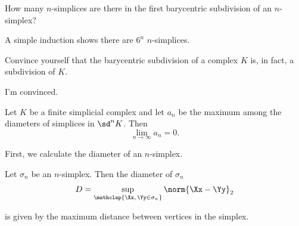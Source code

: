 \begin{problem}[15.24]
  How many $n$-simplices are there in the first barycentric subdivision of an
  $n$-simplex?
\end{problem}
\begin{solution}
  A simple induction shows there are $6^n$ $n$-simplices.
\end{solution}
\begin{problem}[15.25]
  Convince yourself that the barycentric subdivision of a complex $K$ is, in
  fact, a subdivision of $K$.
\end{problem}
\begin{solution}
  I'm convinced.
\end{solution}
\begin{problem}[15.26]
  Let $K$ be a finite simplicial complex and let $a_n$ be the maximum among the
  diameters of simplices in $\sd^n K$. Then
  \[
    \lim_{n\to\infty} a_n = 0.
  \]
\end{problem}
\begin{solution}
  First, we calculate the diameter of an $n$-simplex.
  \begin{leftbar}
    \begin{lemma}
      Let $\sigma_n$ be an $n$-simplex. Then the diameter of $\sigma_n$
      \[
        D = \sup_{\mathclap{\Xx,\, \Yy \in \sigma_n}} \norm{\Xx - \Yy}_2
      \]
    \end{lemma}
    is given by the maximum distance between vertices in the simplex.
  \end{leftbar}

\end{solution}

